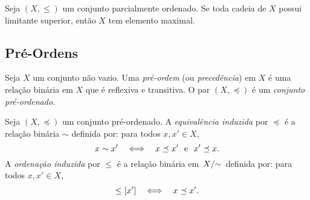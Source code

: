 \begin{lema}
	Seja $(X,\leq)$ um conjunto parcialmente ordenado. Se toda cadeia de $X$ possui limitante superior, então $X$ tem elemento maximal.
\end{lema}

\subsection{Pré-Ordens}

\begin{defi}
Seja $X$ um conjunto não vazio. Uma \emph{pré-ordem} (ou \emph{precedência}) em $X$ é uma relação binária em $X$ que é reflexiva e transitiva. O par $(X,\preceq)$ é um \emph{conjunto pré-ordenado}.
\end{defi}

\begin{defi}
Seja $(X,\preceq)$ um conjunto pré-ordenado. A \emph{equivalência induzida} por $\preceq$ é a relação binária $\sim$ definida por: para todos $x,x' \in X$,
	\begin{equation*}
	x \sim x' \quad \Longleftrightarrow \quad x \preceq x' \text{\ \ e\ \ } x' \preceq x.
	\end{equation*}
A \emph{ordenação induzida} por $\leq$ é a relação binária em $\quo{X}{\sim}$ definida por: para todos $x,x' \in X$,
	\begin{equation*}
	[x] \leq [x'] \sse x \preceq x'.
	\end{equation*}
\end{defi}


